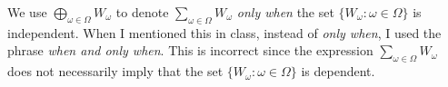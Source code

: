 \probskip

 We use 
$\bigoplus_{\omega \in \Omega} W_\omega$ to denote 
$\sum_{\omega \in \Omega} W_\omega$ \emph{only when} the set
$\{W_\omega : \omega \in \Omega\}$ is independent.  
When I mentioned this in class, instead of \emph{only when}, I used
the phrase \emph{when and only when}. This is incorrect since the expression
$\sum_{\omega \in \Omega} W_\omega$ does not necessarily imply that the set
$\{W_\omega : \omega \in \Omega\}$ is dependent. 




